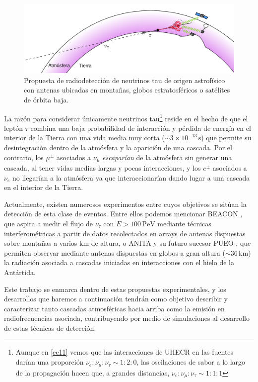 \documentclass[12 pt, a4paper]{article} %
\numberwithin{equation}{section}
\numberwithin{figure}{section}
\numberwithin{table}{section}
\begin{document}
	\begin{figure}[H]
		\centering
		\includegraphics[width=.7\linewidth]{figures/shower_up_v2}
		\caption{Propuesta de radiodetección de neutrinos tau de origen astrofísico con antenas ubicadas en montañas, globos estratosféricos o satélites de órbita baja.}
		\label{shower_up}
	\end{figure}
La razón para considerar únicamente neutrinos tau\footnote{ Aunque en \eqref{ec11} vemos que las interacciones de UHECR en las fuentes darían una proporción $\nu_e:\nu_\mu:\nu_\tau\sim1:2:0$, las oscilaciones de sabor a lo largo de la propagación hacen que, a grandes distancias, $\nu_e:\nu_\mu:\nu_\tau\sim1:1:1$} reside en el hecho de que el leptón $\tau$ combina una baja probabilidad de interacción y pérdida de energía en el interior de la Tierra con una vida media muy corta ($\sim 3\times10^{-13}\,\mathrm{s}$) que permite su desintegración dentro de la atmósfera y la aparición de una cascada. Por el contrario, los $\mu^\pm$ asociados a $\nu_\mu$ \textit{escaparían} de la atmósfera sin generar una cascada, al tener vidas medias largas y pocas interacciones, y los $e^\pm$ asociados a $\nu_e$ no llegarían a la atmósfera ya que interaccionarían dando lugar a una cascada en el interior de la Tierra.

Actualmente, existen numerosos experimentos entre cuyos objetivos se sitúan la detección de esta clase de eventos. Entre ellos podemos mencionar BEACON \cite{wissel2021concept}, que aspira a medir el flujo de $\nu_\tau$ con $E>100\,\mathrm{PeV}$ mediante técnicas interferométricas a partir de datos recolectados en arrays de antenas dispuestas sobre montañas a varios $\mathrm{km}$ de altura, o ANITA y su futuro sucesor PUEO \cite{abarr2021payload}, que permiten observar mediante antenas dispuestas en globos a gran altura ($\sim 36\,\mathrm{km}$) la radiación asociada a cascadas iniciadas en interacciones con el hielo de la Antártida.

Este trabajo se enmarca dentro de estas propuestas experimentales, y los desarrollos que haremos a continuación tendrán como objetivo describir y caracterizar tanto cascadas atmosféricas hacia arriba como la emisión en radiofrecuencias asociada, contribuyendo por medio de simulaciones al desarrollo de estas técnicas de detección.
\clearpage
\end{document}
